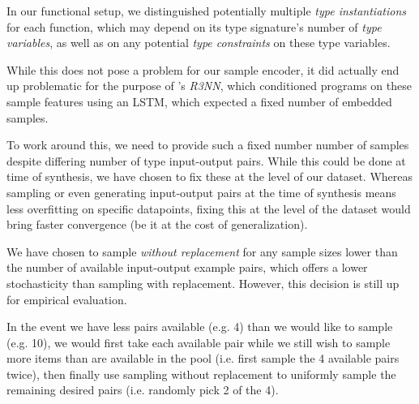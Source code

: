 \documentclass{article}
\begin{document}
    In our functional setup,
    we distinguished potentially multiple \emph{type instantiations} for each function,
    which may depend on its type signature's number of \emph{type variables},
    as well as on any potential \emph{type constraints} on these type variables.


    While this does not pose a problem for our sample encoder,
    it did actually end up problematic for the purpose of \citet{nsps}'s \emph{R3NN},
    which conditioned programs on these sample features using an LSTM,
    which expected a fixed number of embedded samples.

    To work around this, we need to provide such a fixed number number of samples despite differing number of type input-output pairs.
    While this could be done at time of synthesis, we have chosen to fix these at the level of our dataset.
    Whereas sampling or even generating input-output pairs at the time of synthesis means less overfitting on specific datapoints,
    fixing this at the level of the dataset would bring faster convergence (be it at the cost of generalization).

    We have chosen to sample \emph{without replacement} for any
    sample sizes lower than the number of available input-output example pairs,
    which offers a lower stochasticity than sampling with replacement.
    However, this decision is still up for empirical evaluation.

    In the event we have less pairs available (e.g. 4) than we would like to sample (e.g. 10),
    we would first take each available pair while we still wish to sample more items than are available in the pool (i.e. first sample the 4 available pairs twice),
    then finally use sampling without replacement to uniformly sample the remaining desired pairs (i.e. randomly pick 2 of the 4).

\end{document}
